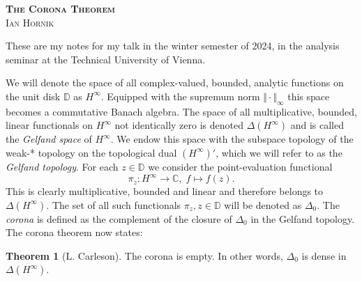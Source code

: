 \documentclass[letterpaper, 11pt]{article}
\newcommand{\C}{\mathbb{C}}
\newcommand{\D}{\mathbb{D}}
\newcommand{\1}{\mathds{1}}
\theoremstyle{definition}
\newtheorem{theorem}{Theorem}
\begin{document}
\author{\normalsize Ian Hornik}
\date{\vspace{-0.8em}\normalsize\today}


\begin{center}
  {\LARGE\scshape\bfseries{The Corona Theorem}} \\
  \scshape{Ian Hornik}
\end{center}

These are my notes for my talk in the winter semester of 2024, in the analysis seminar at the Technical University of Vienna.


We will denote the space of all complex-valued, bounded, analytic functions on the unit disk $\D$ as $H^\infty$. Equipped with the supremum norm $\Vert \cdot \Vert_\infty$ this space becomes a commutative Banach algebra. The space of all multiplicative, bounded, linear functionals on $H^\infty$ not identically zero is denoted $\Delta(H^\infty)$ and is called the \emph{Gelfand space} of $H^\infty$. We endow this space with the subspace topology of the weak\nobreakdash-* topology on the topological dual $(H^\infty)'$, which we will refer to as the \emph{Gelfand topology}. For each $z \in \D$ we consider the point-evaluation functional
\begin{equation*}
  \pi_z : H^\infty \to \C,\; f \mapsto f(z).
\end{equation*}
This is clearly multiplicative, bounded and linear and therefore belongs to $\Delta(H^\infty)$. The set of all such functionals $\pi_z, z \in \D$ will be denoted as $\Delta_0$. The \emph{corona} is defined as the complement of the closure of $\Delta_0$ in the Gelfand topology. The corona theorem now states:

\begin{theorem}[L. Carleson] \label{thm:corona}
  The corona is empty. In other words, $\Delta_0$ is dense in $\Delta(H^\infty)$.
\end{theorem}
\end{document}
